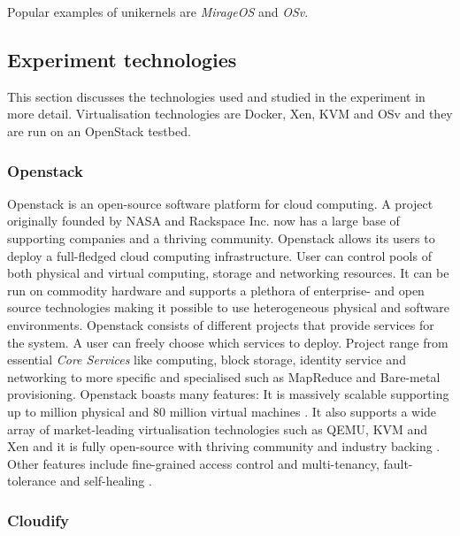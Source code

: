 Popular examples of unikernels are \textit{MirageOS}\cite{mirage} and \textit{OSv}\cite{osv}.

\subsection{Experiment technologies}

This section discusses the technologies used and studied in the experiment in more detail. Virtualisation technologies are Docker, Xen, KVM and OSv and they are run on an OpenStack testbed.

\subsubsection{Openstack}

Openstack \cite{openstackproject} is an open-source software platform for cloud computing. A project originally founded by NASA and Rackspace Inc. now has a large base of supporting companies  \cite{openstackpartners} and a thriving community.
	Openstack allows its users to deploy a full-fledged cloud computing infrastructure. User can control pools of both physical and virtual computing, storage and networking resources. It can be run on commodity hardware and supports a plethora of enterprise- and open source technologies making it possible to use heterogeneous physical and software environments.
	Openstack consists of different projects that provide services for the system. A user can freely choose which services to deploy. Project range from essential \textit{Core Services} like computing, block storage, identity service and networking to more specific and specialised such as MapReduce and Bare-metal provisioning\cite{openstackproject}. Openstack boasts many features: It is massively scalable supporting up to million physical and 80 million virtual machines \cite{openstack}. It also supports a wide array of market-leading virtualisation technologies such as QEMU, KVM and Xen and it is fully open-source with thriving community and industry backing \cite{openstackpartners}. Other features include fine-grained access control and multi-tenancy, fault-tolerance and self-healing \cite{openstackfeatures}.


\subsubsection{Cloudify}

